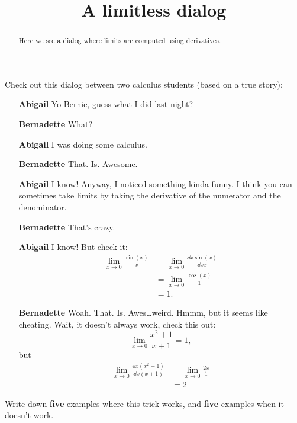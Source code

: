 \documentclass{ximera}
\title[Break-Ground:]{A limitless dialog}
\begin{document}
\begin{abstract}
Here we see a dialog where limits are computed using derivatives.
\end{abstract}
\maketitle

Check out this dialog between two calculus students (based on a true
story):

\begin{itemize}
\item[\textbf{Abigail}] Yo Bernie, guess what I did last night?
\item[\textbf{Bernadette}] What?
\item[\textbf{Abigail}] I was doing some calculus.
\item[\textbf{Bernadette}] That. Is. Awesome.
\item[\textbf{Abigail}] I know! Anyway, I noticed something kinda funny. I
  think you can sometimes take limits by taking the derivative of the
  numerator and the denominator.
\item[\textbf{Bernadette}] That's crazy.
\item[\textbf{Abigail}] I know! But check it:
  \begin{align*}
    \lim_{x\to 0} \frac{\sin(x)}{x} &= \lim_{x\to 0} \frac{\dd{x}\sin(x)}{\dd{x}x}\\
    &= \lim_{x\to 0} \frac{\cos(x)}{1}\\
    &=1.
  \end{align*}
  \item[\textbf{Bernadette}] Woah. That. Is. Awes\dots weird. Hmmm, but it seems like
    cheating. Wait, it doesn't always work, check this out:
    \[
    \lim_{x\to 0} \frac{x^2+1}{x+1} = 1,
    \]
    but
    \begin{align*}
      \lim_{x\to 0} \frac{\dd{x}\left(x^2+1\right)}{\dd{x}\left(x+1\right)} &=
      \lim_{x\to 0} \frac{2x}{1} \\
      &=2
    \end{align*}
\end{itemize}

\begin{problem}
  Write down \textbf{five} examples where this trick works, and \textbf{five}
  examples when it doesn't work.
  \begin{freeResponse}
\end{freeResponse}
\end{problem}
\end{document}
